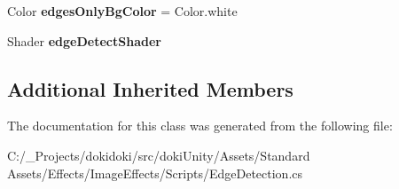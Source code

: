 \begin{DoxyCompactItemize}
\item 
Color {\bfseries edges\+Only\+Bg\+Color} = Color.\+white\hypertarget{class_unity_standard_assets_1_1_image_effects_1_1_edge_detection_adf6fcab3d2b0feb09e7fee606fcfe815}{}\label{class_unity_standard_assets_1_1_image_effects_1_1_edge_detection_adf6fcab3d2b0feb09e7fee606fcfe815}

\item 
Shader {\bfseries edge\+Detect\+Shader}\hypertarget{class_unity_standard_assets_1_1_image_effects_1_1_edge_detection_a5b16193ceaa3c8c019ebf3ac78253c00}{}\label{class_unity_standard_assets_1_1_image_effects_1_1_edge_detection_a5b16193ceaa3c8c019ebf3ac78253c00}

\end{DoxyCompactItemize}
\subsection*{Additional Inherited Members}


The documentation for this class was generated from the following file\+:\begin{DoxyCompactItemize}
\item 
C\+:/\+\_\+\+Projects/dokidoki/src/doki\+Unity/\+Assets/\+Standard Assets/\+Effects/\+Image\+Effects/\+Scripts/Edge\+Detection.\+cs\end{DoxyCompactItemize}
